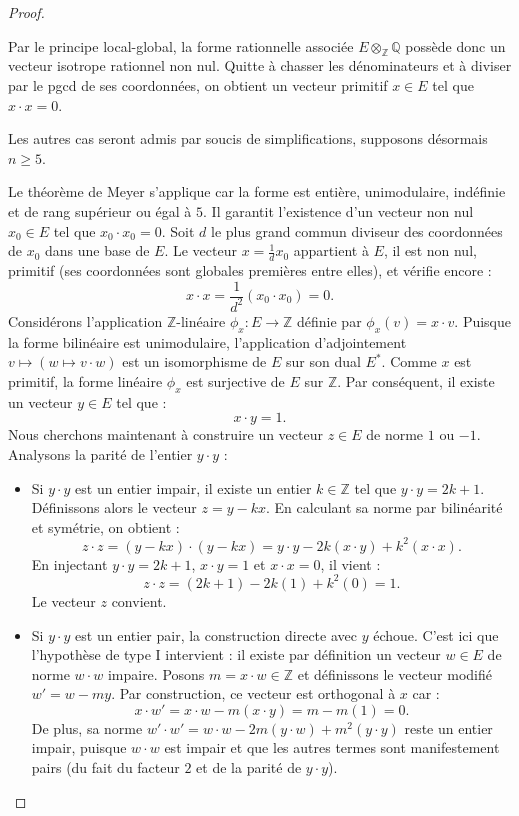 \begin{proof}
\begin{itemize}
    Par le principe local-global, la forme rationnelle associée $E \otimes_\mathbb{Z} \mathbb{Q}$ possède donc un vecteur isotrope rationnel non nul. Quitte à chasser les dénominateurs et à diviser par le pgcd de ses coordonnées, on obtient un vecteur primitif $x \in E$ tel que $x \cdot x = 0$. 
\end{itemize}

Les autres cas seront admis par soucis de simplifications, supposons désormais $n \geq 5$.

Le théorème de Meyer s'applique car la forme est entière, unimodulaire, indéfinie et de rang supérieur ou égal à $5$. Il garantit l'existence d'un vecteur non nul $x_0 \in E$ tel que $x_0 \cdot x_0 = 0$. Soit $d$ le plus grand commun diviseur des coordonnées de $x_0$ dans une base de $E$. Le vecteur $x = \frac{1}{d}x_0$ appartient à $E$, il est non nul, primitif (ses coordonnées sont globales premières entre elles), et vérifie encore :
\[
x \cdot x = \frac{1}{d^2}(x_0 \cdot x_0) = 0.
\]
Considérons l'application $\mathbb{Z}$-linéaire $\phi_x : E \to \mathbb{Z}$ définie par $\phi_x(v) = x \cdot v$. Puisque la forme bilinéaire est unimodulaire, l'application d'adjointement $v \mapsto (w \mapsto v \cdot w)$ est un isomorphisme de $E$ sur son dual $E^*$. Comme $x$ est primitif, la forme linéaire $\phi_x$ est surjective de $E$ sur $\mathbb{Z}$. Par conséquent, il existe un vecteur $y \in E$ tel que :
\[
x \cdot y = 1.
\]
Nous cherchons maintenant à construire un vecteur $z \in E$ de norme $1$ ou $-1$. Analysons la parité de l'entier $y \cdot y$ :
\begin{itemize}
    \item Si $y \cdot y$ est un entier impair, il existe un entier $k \in \mathbb{Z}$ tel que $y \cdot y = 2k + 1$. Définissons alors le vecteur $z = y - kx$. En calculant sa norme par bilinéarité et symétrie, on obtient :
    \[
    z \cdot z = (y - kx) \cdot (y - kx) = y \cdot y - 2k(x \cdot y) + k^2(x \cdot x).
    \]
    En injectant $y \cdot y = 2k+1$, $x \cdot y = 1$ et $x \cdot x = 0$, il vient :
    \[
    z \cdot z = (2k + 1) - 2k(1) + k^2(0) = 1.
    \]
    Le vecteur $z$ convient.

    \item Si $y \cdot y$ est un entier pair, la construction directe avec $y$ échoue. C'est ici que l'hypothèse de type I intervient : il existe par définition un vecteur $w \in E$ de norme $w \cdot w$ impaire. Posons $m = x \cdot w \in \mathbb{Z}$ et définissons le vecteur modifié $w' = w - my$. Par construction, ce vecteur est orthogonal à $x$ car :
    \[
    x \cdot w' = x \cdot w - m(x \cdot y) = m - m(1) = 0.
    \]
    De plus, sa norme $w' \cdot w' = w \cdot w - 2m(y \cdot w) + m^2(y \cdot y)$ reste un entier impair, puisque $w \cdot w$ est impair et que les autres termes sont manifestement pairs (du fait du facteur $2$ et de la parité de $y \cdot y$).
    

\end{itemize}
\end{proof}
